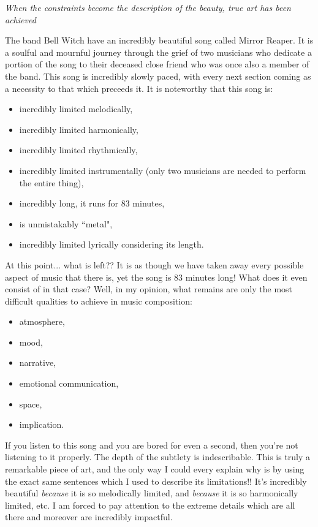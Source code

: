 \documentclass[12pt]{book}
\theoremstyle{plain}
\theoremstyle{definition}
\begin{document}
\begin{center}
	\emph{When the constraints become the description of the beauty, true art has been achieved}
	\end{center}

The band Bell Witch have an incredibly beautiful song called Mirror Reaper. It is a soulful and mournful journey through the grief of two musicians who dedicate a portion of the song to their deceased close friend who was once also a member of the band. This song is incredibly slowly paced, with every next section coming as a necessity to that which preceeds it. It is noteworthy that this song is:
\begin{itemize}
	\item incredibly limited melodically,
	\item incredibly limited harmonically,
	\item incredibly limited rhythmically,
	\item incredibly limited instrumentally (only two musicians are needed to perform the entire thing),
	\item incredibly long, it runs for 83 minutes,
	\item is unmistakably ``metal",
	\item incredibly limited lyrically considering its length.
	\end{itemize}
At this point... what is left?? It is as though we have taken away every possible aspect of music that there is, yet the song is 83 minutes long! What does it even consist of in that case? Well, in my opinion, what remains are only the most difficult qualities to achieve in music composition:
\begin{itemize}
	\item atmosphere,
	\item mood,
	\item narrative,
	\item emotional communication,
	\item space,
	\item implication.
	\end{itemize}
If you listen to this song and you are bored for even a second, then you're not listening to it properly. The depth of the subtlety is indescribable. This is truly a remarkable piece of art, and the only way I could every explain why is by using the exact same sentences which I used to describe its limitations!! It's incredibly beautiful \emph{because} it is so melodically limited, and \emph{because} it is so harmonically limited, etc. I am forced to pay attention to the extreme details which are all there and moreover are incredibly impactful.
\end{document}
